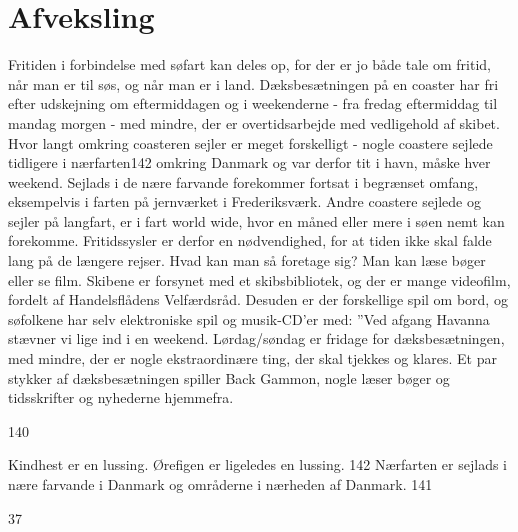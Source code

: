 \chapter{Afveksling}\label{afveksling}

Fritiden i forbindelse med søfart kan deles op, for der er jo både tale
om fritid, når man er til søs, og når man er i land. Dæksbesætningen på
en coaster har fri efter udskejning om eftermiddagen og i weekenderne -
fra fredag eftermiddag til mandag morgen - med mindre, der er
overtidsarbejde med vedligehold af skibet. Hvor langt omkring coasteren
sejler er meget forskelligt - nogle coastere sejlede tidligere i
nærfarten142 omkring Danmark og var derfor tit i havn, måske hver
weekend. Sejlads i de nære farvande forekommer fortsat i begrænset
omfang, eksempelvis i farten på jernværket i Frederiksværk. Andre
coastere sejlede og sejler på langfart, er i fart world wide, hvor en
måned eller mere i søen nemt kan forekomme. Fritidssysler er derfor en
nødvendighed, for at tiden ikke skal falde lang på de længere rejser.
Hvad kan man så foretage sig? Man kan læse bøger eller se film. Skibene
er forsynet med et skibsbibliotek, og der er mange videofilm, fordelt af
Handelsflådens Velfærdsråd. Desuden er der forskellige spil om bord, og
søfolkene har selv elektroniske spil og musik-CD'er med: ''Ved afgang
Havanna stævner vi lige ind i en weekend. Lørdag/søndag er fridage for
dæksbesætningen, med mindre, der er nogle ekstraordinære ting, der skal
tjekkes og klares. Et par stykker af dæksbesætningen spiller Back
Gammon, nogle læser bøger og tidsskrifter og nyhederne hjemmefra.

140

Kindhest er en lussing. Ørefigen er ligeledes en lussing. 142 Nærfarten
er sejlads i nære farvande i Danmark og områderne i nærheden af Danmark.
141

37

